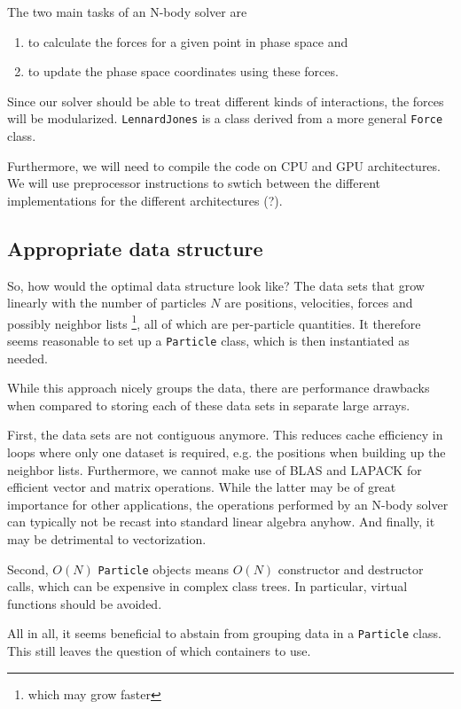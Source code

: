 \documentclass{scrartcl}
\begin{document}
The two main tasks of an N-body solver are
\begin{enumerate}
    \item to calculate the forces for a given point in phase space and 
    \item to update the phase space coordinates using these forces.
\end{enumerate}

Since our solver should be able to treat different kinds of interactions,
the forces will be modularized. \verb|LennardJones| is a class derived
from a more general \verb|Force|  class.

Furthermore, we will need to compile the code on CPU and GPU architectures. 
We will use preprocessor instructions to swtich between the different
implementations for the different architectures (?).

\subsection{Appropriate data structure}
So, how would the optimal data structure look like?
The data sets that grow linearly with the number of particles $N$
are positions, velocities, forces and possibly neighbor lists%
\footnote{which may grow faster}, 
all of which are per-particle quantities.
It therefore seems reasonable to set up a
\verb|Particle| class, which is then instantiated as needed.

While this approach nicely groups the data,
there are performance drawbacks when compared to
storing each of these data sets in separate large arrays.

First, the data sets are not contiguous anymore.
This reduces cache efficiency in loops where only one 
dataset is required, e.g. the positions when building up
the neighbor lists.
Furthermore, we cannot make use of BLAS and LAPACK for efficient
vector and matrix operations. 
While the latter may be of great importance for other applications,
the operations performed by an N-body solver can typically not be recast
into standard linear algebra anyhow.
And finally, it may be detrimental to vectorization.

Second, $O(N)$ \verb|Particle| objects means $O(N)$ constructor
and destructor calls, which can be expensive in complex class trees.
In particular, virtual functions should be avoided.

All in all, it seems beneficial to abstain from 
grouping data in a \verb|Particle| class.
This still leaves the question of which containers to use.
\end{document}
